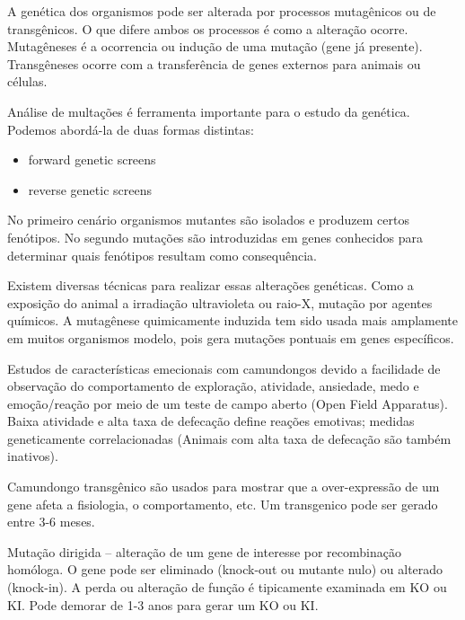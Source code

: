 \documentclass[
	article,			%
	12pt,				%
	oneside,			%
	a4paper,			%
	english,			%
	brazil,				%
	sumario=tradicional
	]{abntex2}
\begin{document}
A genética dos organismos pode ser alterada por processos mutagênicos ou de transgênicos. O que difere ambos os processos é como a alteração ocorre. Mutagêneses é a ocorrencia ou indução de uma mutação (gene já presente). Transgêneses ocorre com a transferência de genes externos para animais ou células.

Análise de multações é ferramenta importante para o estudo da genética. Podemos abordá-la de duas formas distintas:
\begin{itemize}
    \item forward genetic screens
    \item reverse genetic screens
\end{itemize}
No primeiro cenário organismos mutantes são isolados e produzem certos fenótipos.
No segundo mutações são introduzidas em genes conhecidos para determinar quais fenótipos resultam como consequência.

Existem diversas técnicas para realizar essas alterações genéticas. Como a exposição do animal a irradiação ultravioleta ou raio-X, mutação por agentes químicos.
A mutagênese quimicamente induzida tem sido usada mais amplamente em muitos organismos modelo, pois gera mutações pontuais em genes específicos.

Estudos de características emecionais com camundongos devido a facilidade de observação do comportamento de exploração,	atividade,	ansiedade,	medo	e emoção/reação	por meio de	um teste de	campo	aberto	(Open	Field	
Apparatus). Baixa	atividade	e	alta taxa	de	defecação	define	 reações	emotivas;	 medidas	geneticamente correlacionadas	(Animais	com	alta taxa	de	defecação	são	também	inativos).	

Camundongo	transgênico	são usados	para	mostrar	que	a	over-expressão	de	um	gene	afeta	a	fisiologia,	o	
comportamento,	etc. Um	transgenico	pode ser	 gerado	entre	3-6	meses.

Mutação	dirigida	–	alteração	de	um	gene	de	interesse	por recombinação	homóloga. O	gene	pode	ser	eliminado (knock-out	ou	mutante	nulo)	ou	alterado (knock-in).		A	perda	ou	alteração	de	função	é	tipicamente	examinada	em	KO	ou KI. Pode	demorar	de	1-3	anos para	gerar	um	KO	ou	KI.
\end{document}

